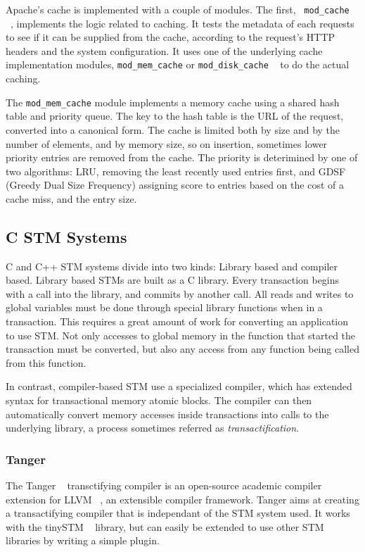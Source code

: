 \documentclass[preprint,natbib,11pt]{sigplanconf}
\begin{document}
Apache's cache is implemented with a couple of modules. The first, {\tt
mod\_cache} ~\cite{apache:mod_cache}, implements the logic related to caching. It
tests the metadata of each requests to see if it can be supplied from the cache,
according to the request's HTTP headers and the system configuration. It uses
one of the underlying cache implementation modules, {\tt mod\_mem\_cache} or
{\tt mod\_disk\_cache} ~\cite{apache:mod_disk_cache} to do the actual caching.

The {\tt mod\_mem\_cache} module implements a memory cache using a shared hash
table and priority queue. The key to the hash table is the URL of the request,
converted into a canonical form. The cache is limited both by size and by the
number of elements, and by memory size, so on insertion, sometimes lower
priority entries are removed from the cache. The priority is deterimined by one
of two algorithms: LRU, removing the least recently used entries first, and GDSF
(Greedy Dual Size Frequency) assigning score to entries based on the cost of a
cache miss, and the entry size.

\subsection{C STM Systems}
C and C++ STM systems divide into two kinds: Library based and compiler based.
Library based STMs are built as a C library. Every transaction begins with a
call into the library, and commits by another call. All reads and writes to
global variables must be done through special library functions when in a
transaction. This requires a great amount of work for converting an application
to use STM. Not only accesses to global memory in the function that started the
transaction must be converted, but also any access from any function being
called from this function. 

In contrast, compiler-based STM use a specialized compiler, which has extended
syntax for transactional memory atomic blocks. The compiler can then
automatically convert memory accesses inside transactions into calls to the
underlying library, a process sometimes referred as \emph{transactification}. 

\subsubsection{\sc Tanger}
The {\sc Tanger} ~\cite{felber2007tanger} transctifying compiler is an
open-source academic compiler extension for LLVM ~\cite{LLVM:CGO04}, an
extensible compiler framework.  Tanger aims at creating a transactifying
compiler that is independant of the STM system used. It works with the tinySTM
~\cite{felber2008tinystm} library, but can easily be extended to use other STM
libraries by writing a simple plugin.
\end{document}
